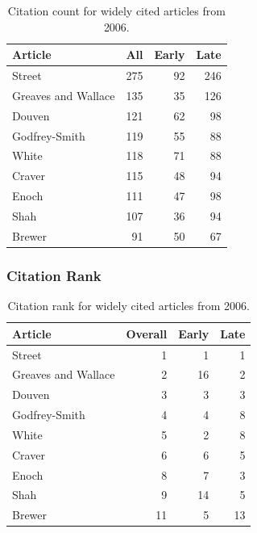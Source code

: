 \documentclass[
  10pt,
  letterpaper,
  DIV=11,
  numbers=noendperiod,
  twoside]{scrartcl}
\begin{document}
\begin{longtable}[]{@{}lrrr@{}}

\caption{\label{tbl-citation-count-2006}Citation count for widely cited
articles from 2006.}

\tabularnewline

\toprule\noalign{}
Article & All & Early & Late \\
\midrule\noalign{}
\endhead
\bottomrule\noalign{}
\endlastfoot
Street & 275 & 92 & 246 \\
Greaves and Wallace & 135 & 35 & 126 \\
Douven & 121 & 62 & 98 \\
Godfrey-Smith & 119 & 55 & 88 \\
White & 118 & 71 & 88 \\
Craver & 115 & 48 & 94 \\
Enoch & 111 & 47 & 98 \\
Shah & 107 & 36 & 94 \\
Brewer & 91 & 50 & 67 \\

\end{longtable}

\subsubsection*{Citation Rank}\label{citation-rank-30}

\begin{longtable}[]{@{}lrrr@{}}

\caption{\label{tbl-citation-rank-2006}Citation rank for widely cited
articles from 2006.}

\tabularnewline

\toprule\noalign{}
Article & Overall & Early & Late \\
\midrule\noalign{}
\endhead
\bottomrule\noalign{}
\endlastfoot
Street & 1 & 1 & 1 \\
Greaves and Wallace & 2 & 16 & 2 \\
Douven & 3 & 3 & 3 \\
Godfrey-Smith & 4 & 4 & 8 \\
White & 5 & 2 & 8 \\
Craver & 6 & 6 & 5 \\
Enoch & 8 & 7 & 3 \\
Shah & 9 & 14 & 5 \\
Brewer & 11 & 5 & 13 \\

\end{longtable}
\end{document}
